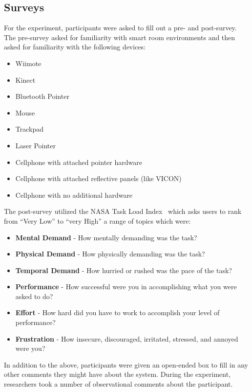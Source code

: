 \subsection{Surveys}

For the experiment, participants were asked to fill out a pre- and
post-survey. The pre-survey asked for familiarity with smart
room environments and then asked for familiarity with the
following devices:

\begin{itemize}
    \item Wiimote
    \item Kinect
    \item Bluetooth Pointer
    \item Mouse
    \item Trackpad
    \item Laser Pointer
    \item Cellphone with attached pointer hardware
    \item Cellphone with attached reflective panels (like VICON)
    \item Cellphone with no additional hardware
\end{itemize}

The post-survey utilized the NASA Task Load 
Index~\cite{hart_development_1988} which asks users to rank
from ``Very Low'' to ``very High'' a range of topics which were:

\begin{itemize}
    \item \textbf{Mental Demand} - How mentally demanding was the task?
    \item \textbf{Physical Demand} - How physically demanding was the task?
    \item \textbf{Temporal Demand} - How hurried or rushed was the pace of the task?
    \item \textbf{Performance} - How successful were you in accomplishing what
you were asked to do?
    \item \textbf{Effort} - How hard did you have to work to accomplish
your level of performance?
    \item \textbf{Frustration} - How insecure, discouraged, irritated, stressed,
and annoyed were you?
\end{itemize}

In addition to the above, participants were given an open-ended
box to fill in any other comments they might have about the system.
During the experiment, researchers took a number of observational
comments about the participant.
